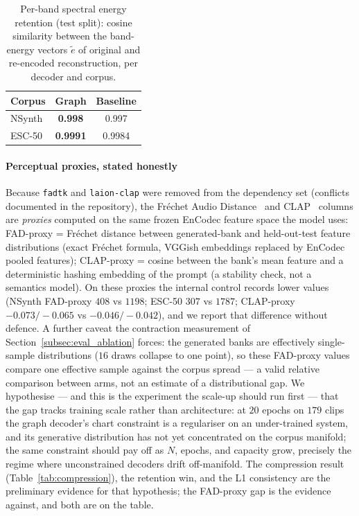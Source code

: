 \documentclass[12pt,a4paper]{article}
\begin{document}
\begin{table}[h]
\centering
\caption{Per-band spectral energy retention (test split): cosine
similarity between the band-energy vectors $\tilde{e}$ of original and
re-encoded reconstruction, per decoder and corpus.}
\begin{tabular}{lcc}
\toprule
Corpus & Graph & Baseline \\
\midrule
NSynth & \textbf{0.998} & 0.997 \\
ESC-50 & \textbf{0.9991} & 0.9984 \\
\bottomrule
\end{tabular}
\label{tab:retention}
\end{table}

\paragraph{Perceptual proxies, stated honestly}
Because \texttt{fadtk} and \texttt{laion-clap} were removed from the
dependency set (conflicts documented in the repository), the
Fr\'echet Audio Distance~\cite{kilgour2019fad} and
CLAP~\cite{laionclap2023} columns are \emph{proxies} computed on the
same frozen EnCodec feature space the model uses: FAD-proxy = Fr\'echet
distance between generated-bank and held-out-test feature distributions
(exact Fr\'echet formula, VGGish embeddings replaced by EnCodec
pooled features); CLAP-proxy = cosine between the bank's mean feature
and a deterministic hashing embedding of the prompt (a stability check,
not a semantics model). On these proxies the internal control records
lower values (NSynth FAD-proxy $408$ vs $1198$; ESC-50 $307$ vs $1787$;
CLAP-proxy $-0.073/-0.065$ vs $-0.046/-0.042$), and we report that
difference without defence. A further caveat the contraction
measurement of Section~\ref{subsec:eval_ablation} forces: the generated
banks are effectively single-sample distributions ($16$ draws collapse
to one point), so these FAD-proxy values compare one effective sample
against the corpus spread — a valid relative comparison between arms,
not an estimate of a distributional gap. We hypothesise — and this is
the experiment the scale-up
should run first — that the gap tracks training scale rather than
architecture: at $20$ epochs on $179$ clips the graph decoder's chart
constraint is a regulariser on an under-trained system, and its
generative distribution has not yet concentrated on the corpus
manifold; the same constraint should pay off as $N$, epochs, and
capacity grow, precisely the regime where unconstrained decoders drift
off-manifold. The compression result
(Table~\ref{tab:compression}), the retention win, and the L1
consistency are the preliminary evidence for that hypothesis; the
FAD-proxy gap is the evidence against, and both are on the table.
\end{document}
